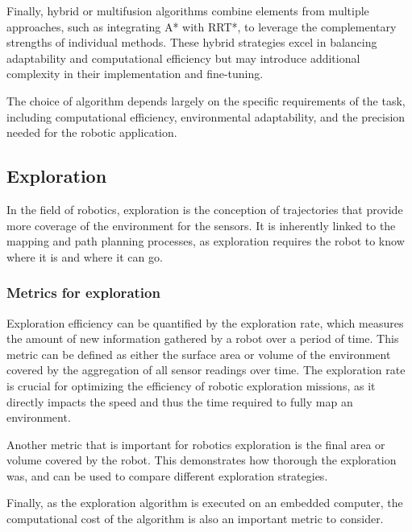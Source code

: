 \documentclass[12pt]{article}
\begin{document}
        Finally, hybrid or multifusion algorithms combine elements from multiple approaches, such as integrating A* with RRT*, to leverage the complementary strengths of individual methods. These hybrid strategies excel in balancing adaptability and computational efficiency but may introduce additional complexity in their implementation and fine-tuning.
        
        The choice of algorithm depends largely on the specific requirements of the task, including computational efficiency, environmental adaptability, and the precision needed for the robotic application.
        

        

    \subsection{Exploration}

        In the field of robotics, exploration is the conception of trajectories that provide more coverage of the environment for the sensors. It is inherently linked to the mapping and path planning processes, as exploration requires the robot to know where it is and where it can go.  
        
        \subsubsection{Metrics for exploration}
        
        Exploration efficiency can be quantified by the exploration rate, which measures the amount of new information gathered by a robot over a period of time. This metric can be defined as either the surface area or volume of the environment covered by the aggregation of all sensor readings over time. The exploration rate is crucial for optimizing the efficiency of robotic exploration missions, as it directly impacts the speed and thus the time required to fully map an environment. 

        Another metric that is important for robotics exploration is the final area or volume covered by the robot. This demonstrates how thorough the exploration was, and can be used to compare different exploration strategies.

        Finally, as the exploration algorithm is executed on an embedded computer, the computational cost of the algorithm is also an important metric to consider. 
\end{document}

